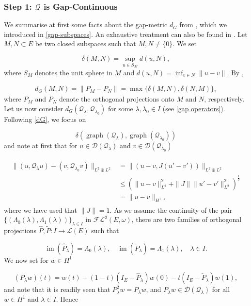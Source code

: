 \documentclass[a4paper,10pt]{article}
\DeclareMathOperator{\im}{im}
\DeclareMathOperator{\gra}{graph}
\begin{document}
\subsubsection*{Step 1: $\mathcal{Q}$ is Gap-Continuous}
We summarise at first some facts about the gap-metric $d_G$ from \cite{Kato}, which we introduced in \eqref{gap-subspaces}. An exhaustive treatment can also be found in \cite[\S 2.4]{thesis}. Let $M,N\subset E$ be two closed subspaces such that $M,N\neq\{0\}$. We set

\[\delta(M,N)=\sup_{u\in S_M}{d(u,N)},\]
where $S_M$ denotes the unit sphere in $M$ and $d(u,N)=\inf_{v\in N}\|u-v\|$. By \cite[p.198]{Kato},

\begin{align}\label{dG}
d_G(M,N)=\|P_M-P_N\|=\max\{\delta(M,N),\delta(N,M)\},
\end{align}
where $P_M$ and $P_N$ denote the orthogonal projections onto $M$ and $N$, respectively.\\
Let us now consider $d_G(\mathcal{Q}_\lambda,\mathcal{Q}_{\lambda_0})$ for some $\lambda,\lambda_0\in I$ (see \eqref{gap operators}). Following \eqref{dG}, we focus on 

\[\delta(\gra(\mathcal{Q}_\lambda),\gra(\mathcal{Q}_{\lambda_0}))\]
and note at first that for $u\in\mathcal{D}(\mathcal{Q}_\lambda)$ and $v\in\mathcal{D}(\mathcal{Q}_{\lambda_0})$

\begin{align}\label{gapcontI}
\begin{split}
\|(u,\mathcal{Q}_\lambda u)-(v,\mathcal{Q}_{\lambda_0}v)\|_{L^2\oplus L^2}&=\|(u-v,J(u'-v'))\|_{L^2\oplus L^2}\\
&\leq \left(\|u-v\|^2_{L^2}+\|J\|\|u'-v'\|^2_{L^2}\right)^\frac{1}{2}\\
&=\|u-v\|_{H^1},
\end{split}
\end{align}
where we have used that $\|J\|=1$. As we assume the continuity of the pair $\{(\Lambda_0(\lambda),\Lambda_1(\lambda))\}_{\lambda\in I}$ in $\mathcal{FL}^2(E,\omega)$, there are two families of orthogonal projections $\hat{P},\tilde{P}:I\rightarrow\mathcal{L}(E)$ such that 

\[\im(\hat{P}_\lambda)=\Lambda_0(\lambda),\quad \im(\tilde{P}_\lambda)=\Lambda_1(\lambda),\quad\lambda\in I.\]
We now set for $w\in H^1$

\[(P_\lambda w)(t)=w(t)-(1-t)(I_E-\hat{P}_\lambda)w(0)-t(I_E-\tilde{P}_\lambda)w(1),\]
and note that it is readily seen that $P^2_\lambda w=P_\lambda w$, and $P_\lambda w\in\mathcal{D}(\mathcal{Q}_\lambda)$ for all $w\in H^1$ and $\lambda\in I$. Hence
\end{document}
